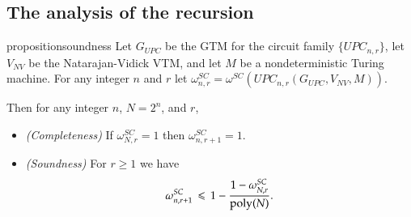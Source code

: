 %




\subsection{The analysis of the recursion}

\begin{restatable}{proposition}{soundness}
	Let $G_{UPC}$ be the GTM for the circuit family $\{UPC_{n,r}\}$, let $V_{NV}$ be the Natarajan-Vidick VTM, and let $M$ be a nondeterministic Turing machine. For any integer $n$ and $r$ let $\omega_{n,r}^{SC} = \omega^{SC}(UPC_{n,r}(G_{UPC},V_{NV},M))$.
	
	Then for any integer $n$, $N=2^n$, and $r$,
	\begin{itemize}
	\item \emph{(Completeness)} If $\omega_{N,r}^{SC}=1$ then $\omega_{n,r+1}^{SC}=1$.
	\item \emph{(Soundness)} For $r \geq 1$ we have
	\[
		\omega_{n,r+1}^{SC} \,\leqslant\, 1 - \frac{1 - \omega_{N,r}^{SC}}{\operatorname{poly}(N)}.
	\]
	\end{itemize}
	\label{prop:UPC_soundness}
\end{restatable}

